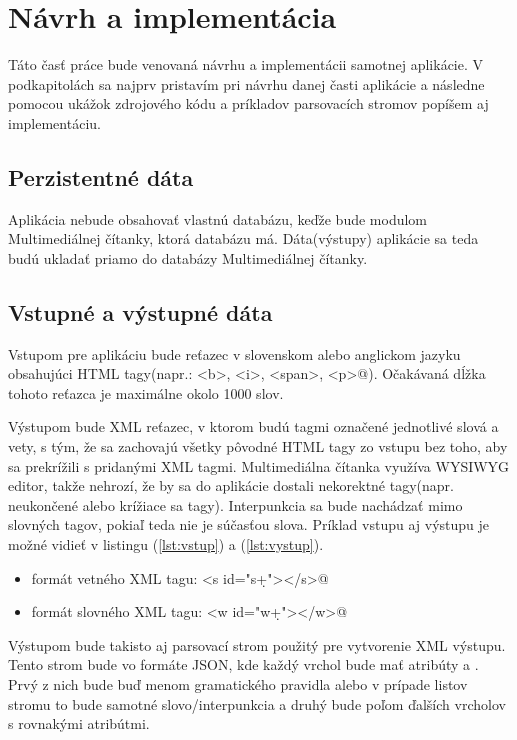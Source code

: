 \documentclass[12pt,a4paper]{report}
\theoremstyle{definition}
\theoremstyle{remark}
\begin{document}

\chapter{Návrh a implementácia}
Táto časť práce bude venovaná návrhu a implementácii samotnej aplikácie. V podkapitolách sa najprv pristavím pri návrhu danej časti aplikácie a následne pomocou ukážok zdrojového kódu a príkladov parsovacích stromov popíšem aj implementáciu.

\section{Perzistentné dáta}
Aplikácia nebude obsahovať vlastnú databázu, keďže bude modulom Multimediálnej čítanky, ktorá databázu má. Dáta(výstupy) aplikácie sa teda budú ukladať priamo do databázy Multimediálnej čítanky.

\section{Vstupné a výstupné dáta}
Vstupom pre aplikáciu bude reťazec v slovenskom alebo anglickom jazyku obsahujúci HTML tagy(napr.: \verb@<b>, <i>, <span>, <p>@). Očakávaná dĺžka tohoto reťazca je maximálne okolo 1000 slov.

Výstupom bude XML reťazec, v ktorom budú tagmi označené jednotlivé slová a vety, s tým, že sa zachovajú všetky pôvodné HTML tagy zo vstupu bez toho, aby sa prekrížili s pridanými XML tagmi. Multimediálna čítanka využíva WYSIWYG editor, takže nehrozí, že by sa do aplikácie dostali nekorektné tagy(napr. neukončené alebo krížiace sa tagy). Interpunkcia sa bude nachádzať mimo slovných tagov, pokiaľ teda nie je súčasťou slova. Príklad vstupu aj výstupu je možné vidieť v listingu (\ref{lst:vstup}) a (\ref{lst:vystup}).  
\begin{itemize}
\item formát vetného XML tagu: \verb@<s id="s\d+"></s>@
\item formát slovného XML tagu: \verb@<w id="w\d+"></w>@
\end{itemize}

Výstupom bude takisto aj parsovací strom použitý pre vytvorenie XML výstupu. Tento strom bude vo formáte JSON, kde každý vrchol bude mať atribúty \verb@name@ a \verb@children@. Prvý z nich bude buď menom gramatického pravidla alebo v prípade listov stromu to bude samotné slovo/interpunkcia a druhý bude poľom ďalších vrcholov s rovnakými atribútmi.
\end{document}
